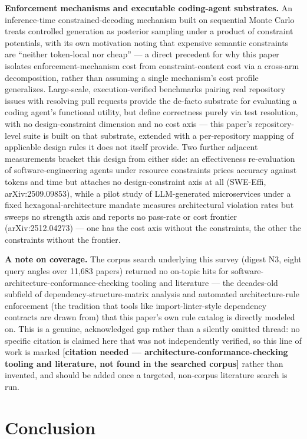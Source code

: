 \documentclass[11pt]{article}
\begin{document}
\textbf{Enforcement mechanisms and executable coding-agent substrates.} An inference-time constrained-decoding mechanism built on sequential Monte Carlo treats controlled generation as posterior sampling under a product of constraint potentials, with its own motivation noting that expensive semantic constraints are ``neither token-local nor cheap'' --- a direct precedent for why this paper isolates enforcement-mechanism cost from constraint-content cost via a cross-arm decomposition, rather than assuming a single mechanism's cost profile generalizes. Large-scale, execution-verified benchmarks pairing real repository issues with resolving pull requests provide the de-facto substrate for evaluating a coding agent's functional utility, but define correctness purely via test resolution, with no design-constraint dimension and no cost axis --- this paper's repository-level suite is built on that substrate, extended with a per-repository mapping of applicable design rules it does not itself provide. Two further adjacent measurements bracket this design from either side: an effectiveness re-evaluation of software-engineering agents under resource constraints prices accuracy against tokens and time but attaches no design-constraint axis at all (SWE-Effi, arXiv:2509.09853), while a pilot study of LLM-generated microservices under a fixed hexagonal-architecture mandate measures architectural violation rates but sweeps no strength axis and reports no pass-rate or cost frontier (arXiv:2512.04273) --- one has the cost axis without the constraints, the other the constraints without the frontier.

\textbf{A note on coverage.} The corpus search underlying this survey (digest N3, eight query angles over 11,683 papers) returned no on-topic hits for software-architecture-conformance-checking tooling and literature --- the decades-old subfield of dependency-structure-matrix analysis and automated architecture-rule enforcement (the tradition that tools like import-linter-style dependency contracts are drawn from) that this paper's own rule catalog is directly modeled on. This is a genuine, acknowledged gap rather than a silently omitted thread: no specific citation is claimed here that was not independently verified, so this line of work is marked \textbf{[citation needed --- architecture-conformance-checking tooling and literature, not found in the searched corpus]} rather than invented, and should be added once a targeted, non-corpus literature search is run.

\section{Conclusion}
\end{document}
